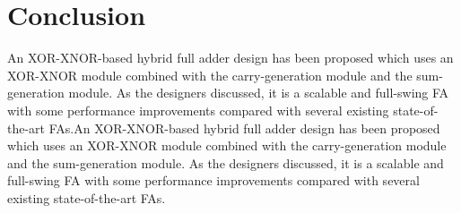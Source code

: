 \documentclass[conference]{IEEEtran}
\begin{document}
\section{Conclusion}

An XOR-XNOR-based hybrid full adder design has been proposed\cite{20212210429416}
which uses an XOR-XNOR module combined with the carry-generation module and the sum-generation module.
As the designers discussed, it is a scalable and full-swing FA
with some performance improvements compared with several existing state-of-the-art FAs.An XOR-XNOR-based hybrid full adder design has been proposed\cite{20212210429416}
which uses an XOR-XNOR module combined with the carry-generation module and the sum-generation module.
As the designers discussed, it is a scalable and full-swing FA
with some performance improvements compared with several existing state-of-the-art FAs.



\end{document}
